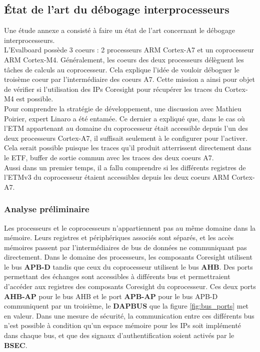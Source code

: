 \subsection{État de l'art du débogage interprocesseurs}
\label{sec:faisabilite_m4}

Une étude annexe a consisté à faire un état de l'art concernant le débogage
interprocesseurs. \\

L'Evalboard possède 3 coeurs : 2 processeurs ARM Cortex-A7 et un coprocesseur
ARM Cortex-M4. Généralement, les coeurs des deux processeurs délèguent les
tâches de calculs au coprocesseur. Cela explique l'idée de vouloir déboguer le
troisème coeur par l'intermédiaire des coeurs A7. Cette mission a ainsi pour
objet de vérifier si l'utilisation des IPs Coresight pour récupérer les traces
du Cortex-M4 est possible. \\

Pour comprendre la stratégie de développement, une discussion avec Mathieu
Poirier, expert Linaro a été entamée. Ce dernier a expliqué que, dans le cas
où l'ETM appartenant au domaine du coprocesseur était accessible depuis l'un
des deux processeurs Cortex-A7, il suffisait seulement à le configurer pour
l'activer.  Cela serait possible puisque les traces qu'il produit atterrissent
directement dans le ETF, buffer de sortie commun avec les traces des deux
coeurs A7. \\

Aussi dans un premier temps, il a fallu comprendre si les différents registres
de l'ETMv3 du coprocesseur étaient accessibles depuis les deux coeurs ARM
Cortex-A7.
 
\subsubsection{Analyse préliminaire}
\label{sec:initial_analysis}

Les processeurs et le coprocesseurs n'appartiennent pas au même domaine dans
la mémoire. Leurs registres et périphériques associés sont séparés, et les
accès mémoires passent par l'intermédiaires de bus de données ne communiquant
pas directement. Dans le domaine des processeurs, les composants Coresight
utilisent le bus \textbf{APB-D} tandis que ceux du coprocesseur utilisent le
bus \textbf{AHB}. Des ports permettant des échanges sont accessibles à
différents bus et permettraient d'accéder aux registres des composants
Coresight du coprocesseur. Ces deux ports \textbf{AHB-AP} pour le bus AHB et
le port \textbf{APB-AP} pour le bus APB-D communiquent par un troisième, le
\textbf{DAPBUS} que la figure \ref{fig:bus_ports} met en valeur.  Dans une
mesure de sécurité, la communication entre ces différents bus n'est possible à
condition qu'un espace mémoire pour les IPs soit implémenté dans chaque bus,
et que des signaux d'authentification soient activés par le \textbf{BSEC}.  \\

